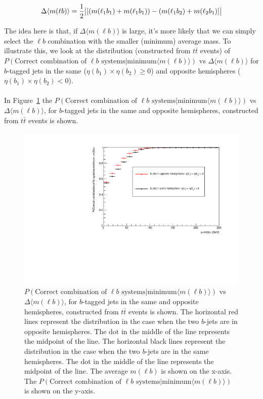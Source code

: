 \begin{equation}
    \Delta \langle m(\ell b) \rangle = \frac{1}{2} \abs{[( m(\ell_{1} b_{1}) + m(\ell_{1} b_{1}) ) - ( m(\ell_{1} b_{2}) + m(\ell_{2} b_{1}) ]}
\end{equation}

 The idea here is that, if $\Delta \langle m(\ell b) \rangle$ is large, it's more likely that we can simply select the $\ell b$ combination with the smaller (minimum) average mass. To illustrate this, we look at the distribution (constructed from $t\bar{t}$ events) of $P(\text{Correct combination of } \ell b \text{ systems} | \text{minimum} \langle m(\ell b) \rangle)$ vs $\Delta \langle m(\ell b) \rangle$ for $b$-tagged jets in the same ($\eta(b_{1}) \times \eta(b_{2}) \geq 0$) and opposite hemispheres ($\eta(b_{1}) \times \eta(b_{2}) < 0$).\\\\
 In Figure~\ref{fig:lb-assoc} the $P(\text{Correct combination of } \ell b \text{ systems} | \text{minimum} \langle m(\ell b) \rangle)$ vs $\Delta \langle m(\ell b) \rangle$, for $b$-tagged jets in the same and opposite hemispheres, constructed from $t\bar{t}$ events is shown.
 \begin{figure}[h!]
	\includegraphics[width=0.7\linewidth]{figures/lbassoc_2vSM.pdf}
	\centering
	\caption{$P(\text{Correct combination of } \ell b \text{ systems} | \text{minimum} \langle m(\ell b) \rangle)$ vs $\Delta \langle m(\ell b) \rangle$, for $b$-tagged jets in the same and opposite hemispheres, constructed from $t\bar{t}$ events is shown. The horizontal red lines represent the distribution in the case when the two $b$-jets are in opposite hemispheres. The dot in the middle of the line represents the midpoint of the line. The horizontal black lines represent the distribution in the case when the two $b$-jets are in the same hemispheres. The dot in the middle of the line represents the midpoint of the line. The average $m(\ell b)$ is shown on the x-axis. The $P(\text{Correct combination of } \ell b \text{ systems} | \text{minimum} \langle m(\ell b) \rangle)$ is shown on the y-axis.}
	\label{fig:lb-assoc}
\end{figure}

